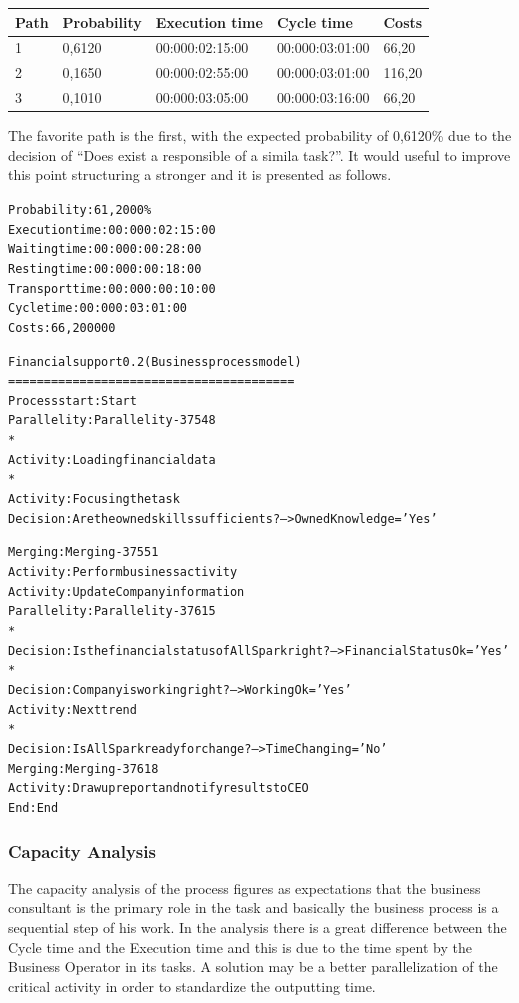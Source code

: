 \begin{table}[ht!]
\centering
\begin{tabular}{|l|l|l|l|l|}
\hline
Path&Probability&Execution time&Cycle time&Costs\\
\hline
1&0,6120&00:000:02:15:00&00:000:03:01:00&66,20\\
\hline
2&0,1650&00:000:02:55:00&00:000:03:01:00&116,20\\
\hline
3&0,1010&00:000:03:05:00&00:000:03:16:00&66,20\\
\hline
\end{tabular}
\end{table}

The favorite path is the first, with the expected probability of 0,6120\% due to the decision of ``Does exist a responsible of a simila task?''. It would useful to improve this point structuring a stronger  and it is presented as follows.\\

\begin{alltt}
Probability:   61,2000\%
Execution time:  00:000:02:15:00
Waiting time:  00:000:00:28:00
Resting time:  00:000:00:18:00
Transport time:  00:000:00:10:00
Cycle time:  00:000:03:01:00
Costs:  66,200000

Financial support 0.2 (Business process model)
========================================
Process start: Start
Parallelity: Parallelity-37548
    *
    Activity: Loading financial data
    *
    Activity: Focusing the task
    Decision: Are the owned skills sufficients? --> OwnedKnowledge='Yes'

Merging: Merging-37551
Activity: Perform business activity
Activity: Update Company information
Parallelity: Parallelity-37615
    *
    Decision: Is the financial status of AllSpark right? --> FinancialStatusOk='Yes'
    *
    Decision: Company is working right? --> WorkingOk='Yes'
    Activity: Next trend
    *
    Decision: Is AllSpark ready for change? --> TimeChanging='No'
Merging: Merging-37618
Activity: Draw up report and notify results to CEO
End: End
\end{alltt}


\subsubsection{Capacity Analysis}
The capacity analysis of the process figures as expectations that the business consultant is the primary role in the task and basically the business process is a sequential step of his work. In the analysis there is a great difference between the Cycle time and the Execution time and this is due to the time spent by the Business Operator in its tasks. A solution may be a better parallelization of the critical activity in order to standardize the outputting time.

